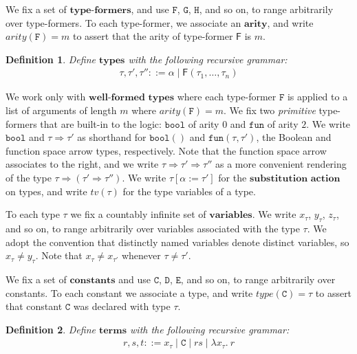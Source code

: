 \documentclass[a4paper, 10pt]{article}
\newtheorem{definition}{Definition}[section]
\newcommand{\deffont}[1]{\ensuremath{\textbf{#1}}}
\newcommand{\lam}[1]{\lambda{#1}.\ }
\begin{document}
We fix a set of \deffont{type-formers}, and use $\mathtt{F}$, $\mathtt{G}$, $\mathtt{H}$, and so on, to range arbitrarily over type-formers.
To each type-former, we associate an \deffont{arity}, and write $arity(\mathtt{F}) = m$ to assert that the arity of type-former $\mathsf{F}$ is $m$.

\begin{definition}
\label{defn.types}
Define \deffont{types} with the following recursive grammar:
\begin{gather*}
\tau, \tau', \tau'' ::= \alpha \mid \mathsf{F}(\tau_1, \ldots, \tau_n)
\end{gather*}
\end{definition}

We work only with \deffont{well-formed types} where each type-former $\mathtt{F}$ is applied to a list of arguments of length $m$ where $arity(\mathtt{F}) = m$.
We fix two \emph{primitive} type-formers that are built-in to the logic: $\mathtt{bool}$ of arity $0$ and $\mathtt{fun}$ of arity $2$.
We write $\mathtt{bool}$ and $\tau \Rightarrow \tau'$ as shorthand for $\mathtt{bool}()$ and $\mathtt{fun}(\tau, \tau')$, the Boolean and function space arrow types, respectively.
Note that the function space arrow associates to the right, and we write $\tau \Rightarrow \tau' \Rightarrow \tau''$ as a more convenient rendering of the type $\tau \Rightarrow (\tau' \Rightarrow \tau'')$.
We write $\tau[\alpha := \tau']$ for the \deffont{substitution action} on types, and write $tv(\tau)$ for the type variables of a type.

To each type $\tau$ we fix a countably infinite set of \deffont{variables}.
We write $x_\tau$, $y_\tau$, $z_\tau$, and so on, to range arbitrarily over variables associated with the type $\tau$.
We adopt the convention that distinctly named variables denote distinct variables, so $x_\tau \neq y_\tau$.
Note that $x_\tau \neq x_{\tau'}$ whenever $\tau \neq \tau'$.

We fix a set of \deffont{constants} and use $\mathtt{C}$, $\mathtt{D}$, $\mathtt{E}$, and so on, to range arbitrarily over constants.
To each constant we associate a type, and write $type(\mathtt{C}) = \tau$ to assert that constant $\mathtt{C}$ was declared with type $\tau$.

\begin{definition}
\label{defn.terms}
Define \deffont{terms} with the following recursive grammar:
\begin{gather*}
r,s,t ::= x_\tau \mid \mathtt{C} \mid rs \mid \lam{x_\tau}r
\end{gather*}
\end{definition}
\end{document}

